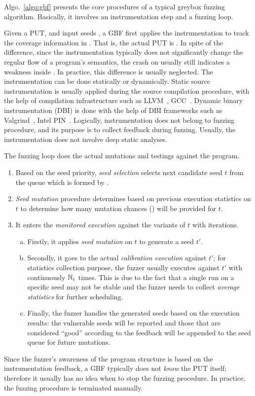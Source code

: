 Algo.~\ref{algo:gbf} presents the core procedures of a typical greybox fuzzing algorithm. Basically, it involves an instrumentation step and a fuzzing loop.

Given a PUT, \ProgO and input seeds \Seeds, a GBF first applies the instrumentation to track the coverage information in \ProgO. That is, the actual PUT is \Prog. In spite of the difference, since the instrumentation typically does not significantly change the regular flow of a program's semantics, the crash on \Prog usually still indicates a weakness inside \ProgO. In practice, this difference is usually neglected.
The instrumentation can be done statically or dynamically. Static source instrumentation is usually applied during the source compilation procedure, with the help of compilation infrastructure such as LLVM~\cite{Lattner:2004:LCF:977395.977673}, GCC~\cite{gcc}. Dynamic binary instrumentation (DBI) is done with the help of DBI frameworks such as Valgrind~\cite{valgrind}, Intel PIN~\cite{pin}. Logically, instrumentation does not belong to fuzzing procedure, and its purpose is to collect feedback during fuzzing. Usually, the instrumentation does not involve deep static analyses.


The fuzzing loop does the actual mutations and testings against the program.
\begin{enumerate}[1.]
	\item Based on the seed priority, \emph{seed selection} selects next candidate seed $t$ from the queue which is formed by \Seeds.
	\item \emph{Seed mutation} procedure determines based on previous execution statistics on $t$ to determine how many mutation chances (\mutChance) will be provided for $t$.
	\item It enters the \emph{monitored execution} against the variants of $t$ with \mutChance iterations. 
	\begin{enumerate}[a)]
	\item Firstly, it applies \emph{seed mutation} on $t$ to generate a seed $t'$. 
	\item Secondly, it goes to the actual \emph{calibration execution} against $t'$; for statistics collection purpose, the fuzzer usually executes \Prog against $t'$ with continuously $\mathbb{N}_{c}$ times. This is due to the fact that a single run on a specific seed may not be stable and the fuzzer needs to collect \emph{average statistics} for further scheduling.
	\item Finally, the fuzzer handles the generated seeds based on the execution results: the vulnerable seeds will be reported and those that are considered ``good'' according to the feedback will be appended to the seed queue for future mutations.
	\end{enumerate}
\end{enumerate}
Since the fuzzer's awareness of the program structure is based on the instrumentation feedback, a GBF typically does not \emph{know} the PUT itself; therefore it usually has no idea when to stop the fuzzing procedure. In practice, the fuzzing procedure is terminated manually.

